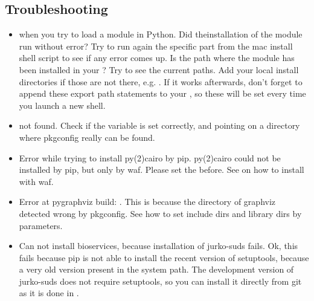 \documentclass[letterpaper,10pt,english]{sphinxmanual}
\begin{document}
\subsection{Troubleshooting}
\label{\detokenize{index:troubleshooting}}\begin{itemize}
\item {} 
 when you try to load a module in Python. Did
theinstallation of the module run without error? Try to run again the specific
part from the mac install shell script to see if any error comes up. Is the
path where the module has been installed in your ? Try  to see the current paths. Add your local install directories if
those are not there, e.g.
.
If it works afterwards, don’t forget to append these export path statements to
your , so these will be set every time you launch a new
shell.

\item {} 
 not found. Check if the  variable is
set correctly, and pointing on a directory where pkgconfig really can be
found.

\item {} 
Error while trying to install py(2)cairo by pip. py(2)cairo could not be
installed by pip, but only by waf. Please set the  before.
See  on how to install with waf.

\item {} 
Error at pygraphviz build: . This is
because the directory of graphviz detected wrong by pkgconfig. See
 how to set include dirs and library dirs by
 parameters.

\item {} 
Can not install bioservices, because installation of jurko-suds fails. Ok,
this fails because pip is not able to install the recent version of
setuptools, because a very old version present in the system path. The
development version of jurko-suds does not require setuptools, so you can
install it directly from git as it is done in .


\end{itemize}
\end{document}
